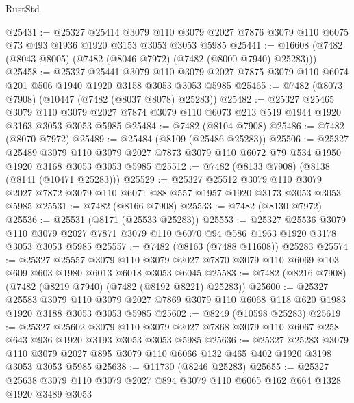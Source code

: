 \begin{lexlean}{RustStd}
\begin{coremodule}
@25431 := @25327
    @25414
    @3079
    @110
    @3079
    @2027
    @7876
    @3079
    @110
    @6075
    @73
    @493
    @1936
    @1920
    @3153
    @3053
    @3053
    @5985
@25441 := @16608 (@7482 (@8043 @8005) (@7482 (@8046 @7972) (@7482 (@8000 @7940) @25283)))
@25458 := @25327
    @25441
    @3079
    @110
    @3079
    @2027
    @7875
    @3079
    @110
    @6074
    @201
    @506
    @1940
    @1920
    @3158
    @3053
    @3053
    @5985
@25465 := @7482 (@8073 @7908) (@10447 (@7482 (@8037 @8078) @25283))
@25482 := @25327
    @25465
    @3079
    @110
    @3079
    @2027
    @7874
    @3079
    @110
    @6073
    @213
    @519
    @1944
    @1920
    @3163
    @3053
    @3053
    @5985
@25484 := @7482 (@8104 @7908)
@25486 := @7482 (@8070 @7972)
@25489 := @25484 (@8109 (@25486 @25283))
@25506 := @25327
    @25489
    @3079
    @110
    @3079
    @2027
    @7873
    @3079
    @110
    @6072
    @79
    @534
    @1950
    @1920
    @3168
    @3053
    @3053
    @5985
@25512 := @7482 (@8133 @7908) (@8138 (@8141 (@10471 @25283)))
@25529 := @25327
    @25512
    @3079
    @110
    @3079
    @2027
    @7872
    @3079
    @110
    @6071
    @88
    @557
    @1957
    @1920
    @3173
    @3053
    @3053
    @5985
@25531 := @7482 (@8166 @7908)
@25533 := @7482 (@8130 @7972)
@25536 := @25531 (@8171 (@25533 @25283))
@25553 := @25327
    @25536
    @3079
    @110
    @3079
    @2027
    @7871
    @3079
    @110
    @6070
    @94
    @586
    @1963
    @1920
    @3178
    @3053
    @3053
    @5985
@25557 := @7482 (@8163 (@7488 @11608)) @25283
@25574 := @25327
    @25557
    @3079
    @110
    @3079
    @2027
    @7870
    @3079
    @110
    @6069
    @103
    @609
    @603
    @1980
    @6013
    @6018
    @3053
    @6045
@25583 := @7482 (@8216 @7908) (@7482 (@8219 @7940) (@7482 (@8192 @8221) @25283))
@25600 := @25327
    @25583
    @3079
    @110
    @3079
    @2027
    @7869
    @3079
    @110
    @6068
    @118
    @620
    @1983
    @1920
    @3188
    @3053
    @3053
    @5985
@25602 := @8249 (@10598 @25283)
@25619 := @25327
    @25602
    @3079
    @110
    @3079
    @2027
    @7868
    @3079
    @110
    @6067
    @258
    @643
    @936
    @1920
    @3193
    @3053
    @3053
    @5985
@25636 := @25327
    @25283
    @3079
    @110
    @3079
    @2027
    @895
    @3079
    @110
    @6066
    @132
    @465
    @402
    @1920
    @3198
    @3053
    @3053
    @5985
@25638 := @11730 (@8246 @25283)
@25655 := @25327
    @25638
    @3079
    @110
    @3079
    @2027
    @894
    @3079
    @110
    @6065
    @162
    @664
    @1328
    @1920
    @3489
    @3053

\end{coremodule}
\end{lexlean}
